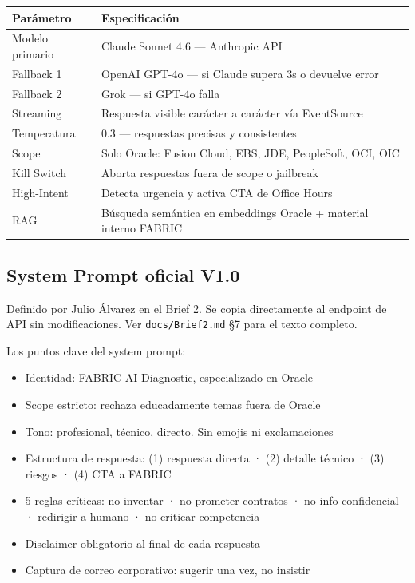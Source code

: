 \documentclass[11pt, a4paper]{article}
\newcommand{\ruta}[1]{\texttt{\color{accent2}#1}}
\begin{document}
\begin{table}[h]
\centering
\begin{tabularx}{\linewidth}{>{\ttfamily\color{accent}\small}l X}
\toprule
Parámetro & Especificación \\
\midrule
Modelo primario    & Claude Sonnet 4.6 — Anthropic API \\
Fallback 1         & OpenAI GPT-4o — si Claude supera 3s o devuelve error \\
Fallback 2         & Grok — si GPT-4o falla \\
Streaming          & Respuesta visible carácter a carácter vía EventSource \\
Temperatura        & 0.3 — respuestas precisas y consistentes \\
Scope              & Solo Oracle: Fusion Cloud, EBS, JDE, PeopleSoft, OCI, OIC \\
Kill Switch        & Aborta respuestas fuera de scope o jailbreak \\
High-Intent        & Detecta urgencia y activa CTA de Office Hours \\
RAG                & Búsqueda semántica en embeddings Oracle + material interno FABRIC \\
\bottomrule
\end{tabularx}
\end{table}

\subsection{System Prompt oficial V1.0}

Definido por Julio Álvarez en el Brief 2. Se copia directamente al endpoint de API
sin modificaciones. Ver \ruta{docs/Brief2.md} §7 para el texto completo.

Los puntos clave del system prompt:
\begin{itemize}[leftmargin=*]
  \item Identidad: FABRIC AI Diagnostic, especializado en Oracle
  \item Scope estricto: rechaza educadamente temas fuera de Oracle
  \item Tono: profesional, técnico, directo. Sin emojis ni exclamaciones
  \item Estructura de respuesta: (1) respuesta directa · (2) detalle técnico ·
        (3) riesgos · (4) CTA a FABRIC
  \item 5 reglas críticas: no inventar · no prometer contratos · no info confidencial ·
        redirigir a humano · no criticar competencia
  \item Disclaimer obligatorio al final de cada respuesta
  \item Captura de correo corporativo: sugerir una vez, no insistir
\end{itemize}
\end{document}
